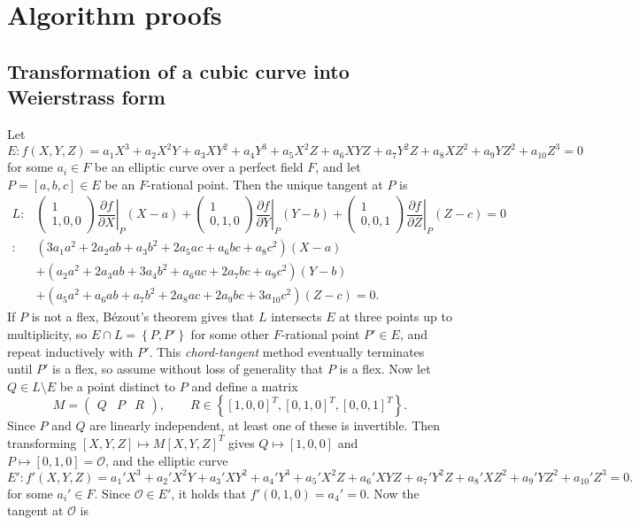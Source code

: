 \documentclass{article}
\newcommand{\val}[1]{\left. #1 \right\rvert}
\newcommand{\rb}[1]{\left( #1 \right)}
\renewcommand{\sb}[1]{\left[ #1 \right]}
\newcommand{\cb}[1]{\left\{ #1 \right\}}
\newcommand{\twobyone}[2]{\begin{pmatrix} #1 \\ #2 \end{pmatrix}}
\newcommand{\onebythree}[3]{\begin{pmatrix} #1 & #2 & #3 \end{pmatrix}}
\theoremstyle{definition}
\begin{document}
\pagebreak

\section{Algorithm proofs}

\subsection{Transformation of a cubic curve into Weierstrass form}

Let
$$ E : f\rb{X, Y, Z} = a_1X^3 + a_2X^2Y + a_3XY^2 + a_4Y^3 + a_5X^2Z + a_6XYZ + a_7Y^2Z + a_8XZ^2 + a_9YZ^2 + a_{10}Z^3 = 0 $$
for some $ a_i \in F $ be an elliptic curve over a perfect field $ F $, and let $ P = \sb{a, b, c} \in E $ be an $ F $-rational point. Then the unique tangent at $ P $ is
\begin{align*}
L
: & \twobyone{1}{1, 0, 0}\val{\dfrac{\partial f}{\partial X}}_P\rb{X - a} + \twobyone{1}{0, 1, 0}\val{\dfrac{\partial f}{\partial Y}}_P\rb{Y - b} + \twobyone{1}{0, 0, 1}\val{\dfrac{\partial f}{\partial Z}}_P\rb{Z - c} = 0 \\
: & \rb{3a_1a^2 + 2a_2ab + a_3b^2 + 2a_5ac + a_6bc + a_8c^2}\rb{X - a} \\
& + \rb{a_2a^2 + 2a_3ab + 3a_4b^2 + a_6ac + 2a_7bc + a_9c^2}\rb{Y - b} \\
& + \rb{a_5a^2 + a_6ab + a_7b^2 + 2a_8ac + 2a_9bc + 3a_{10}c^2}\rb{Z - c} = 0.
\end{align*}
If $ P $ is not a flex, B\'ezout's theorem gives that $ L $ intersects $ E $ at three points up to multiplicity, so $ E \cap L = \cb{P, P'} $ for some other $ F $-rational point $ P' \in E $, and repeat inductively with $ P' $. This \emph{chord-tangent} method eventually terminates until $ P' $ is a flex, so assume without loss of generality that $ P $ is a flex. Now let $ Q \in L \setminus E $ be a point distinct to $ P $ and define a matrix
$$ M = \onebythree{Q}{P}{R}, \qquad R \in \cb{\sb{1, 0, 0}^T, \sb{0, 1, 0}^T, \sb{0, 0, 1}^T}. $$
Since $ P $ and $ Q $ are linearly independent, at least one of these is invertible. Then transforming $ \sb{X, Y, Z} \mapsto M\sb{X, Y, Z}^T $ gives $ Q \mapsto \sb{1, 0, 0} $ and $ P \mapsto \sb{0, 1, 0} = \mathcal{O} $, and the elliptic curve
$$ E' : f'\rb{X, Y, Z} = a_1'X^3 + a_2'X^2Y + a_3'XY^2 + a_4'Y^3 + a_5'X^2Z + a_6'XYZ + a_7'Y^2Z + a_8'XZ^2 + a_9'YZ^2 + a_{10}'Z^3 = 0. $$
for some $ a_i' \in F $. Since $ \mathcal{O} \in E' $, it holds that $ f'\rb{0, 1, 0} = a_4' = 0 $. Now the tangent at $ \mathcal{O} $ is
\end{document}
